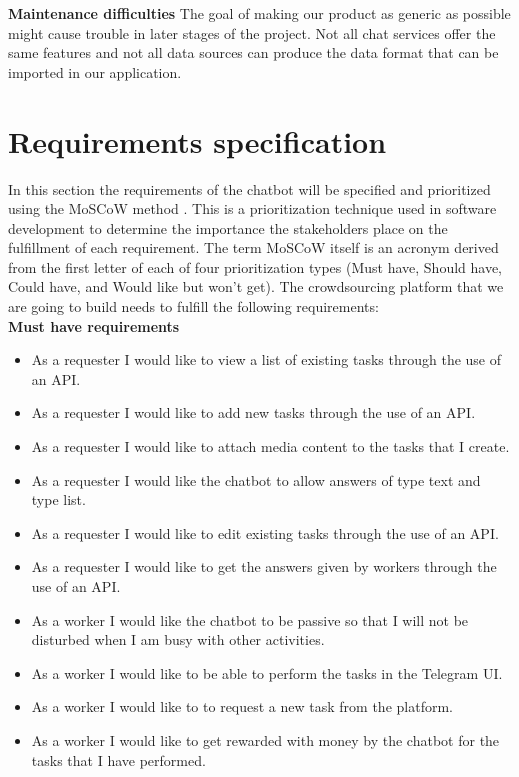 \documentclass[a4paper,dutch,fleqn]{exam}
\begin{document}
\textbf{Maintenance difficulties}
The goal of making our product as generic as possible might cause trouble in later stages of the project. Not all chat services offer the same features and not all data sources can produce the data format that can be imported in our application. 

\section{Requirements specification}
In this section the requirements of the chatbot will be specified and prioritized using the MoSCoW method \cite{highsmith2001agile}. This is a prioritization technique used in software development to determine the importance the stakeholders place on the fulfillment of each requirement. The term MoSCoW itself is an acronym derived from the first letter of each of four prioritization types (Must have, Should have, Could have, and Would like but won't get). The crowdsourcing platform that we are going to build needs to fulfill the following requirements: \\

\textbf{Must have requirements}
\begin{itemize}
\itemsep0em 
\item As a requester I would like to view a list of existing tasks through the use of an API.
\item As a requester I would like to add new tasks through the use of an API.
\item As a requester I would like to attach media content to the tasks that I create.
\item As a requester I would like the chatbot to allow answers of type text and type list.
\item As a requester I would like to edit existing tasks through the use of an API.
\item As a requester I would like to get the answers given by workers through the use of an API.
\item As a worker I would like the chatbot to be passive so that I will not be disturbed when I am busy with other activities. 
\item As a worker I would like to be able to perform the tasks in the Telegram UI.
\item As a worker I would like to to request a new task from the platform.
\item As a worker I would like to get rewarded with money by the chatbot for the tasks that I have performed.
\end{itemize}
 
\end{document}
